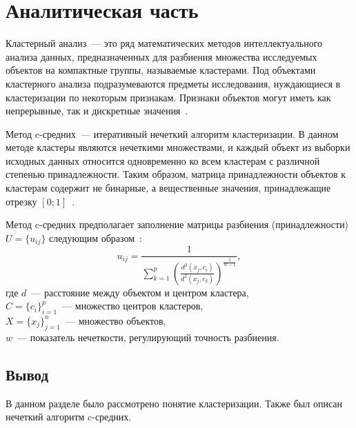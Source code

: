 \chapter{Аналитическая часть}

Кластерный анализ~--- это ряд математических методов интеллектуального анализа данных, предназначенных для разбиения множества исследуемых объектов на компактные группы, называемые кластерами. Под объектами кластерного анализа подразумеваются предметы исследования, нуждающиеся в кластеризации по некоторым признакам.
Признаки объектов могут иметь как непрерывные, так и дискретные значения~\cite{c-means}.

Метод c-средних~--- итеративный нечеткий алгоритм кластеризации.
В данном методе кластеры являются нечеткими множествами, и каждый объект из выборки исходных данных относится одновременно ко всем кластерам с различной степенью принадлежности.
Таким образом, матрица принадлежности объектов к кластерам содержит не бинарные, а вещественные значения, принадлежащие отрезку $[0; 1]$~\cite{c-means}.

Метод c-средних предполагает заполнение матрицы разбиения (принадлежности) $U = \{u_{ij}\}$ следующим образом~\cite{c-means}:
\begin{equation}
	u_{ij} = \frac{1}{\sum_{k=1}^{p} \left( \frac{d^2 (x_j, c_i) }{ d^2 (x_j, c_k) } \right)^\frac{1}{w - 1}},
\end{equation}
где $d$~--- расстояние между объектом и центром кластера,
\\ $C = \{c_i\}_{i=1}^p$~--- множество центров кластеров,
\\ $X = \{x_j\}_{j=1}^n$~--- множество объектов,
\\ $w$~--- показатель нечеткости, регулирующий точность разбиения.

\section*{Вывод}
В данном разделе было рассмотрено понятие кластеризации.
Также был описан нечеткий алгоритм c-средних.